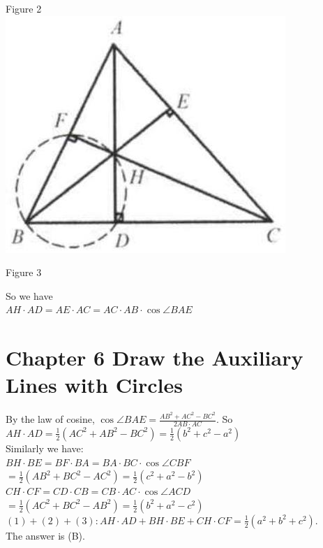 \documentclass[10pt]{article}
\begin{document}
Figure 2\\
\includegraphics[max width=\textwidth, center]{2025_04_17_97bc1f7e44d93c271a88g-210(1)}

Figure 3

So we have\\
\(A H \cdot A D=A E \cdot A C=A C \cdot A B \cdot \cos \angle B A E\)

\section*{Chapter 6 Draw the Auxiliary Lines with Circles}
By the law of cosine, \(\cos \angle B A E=\frac{A B^{2}+A C^{2}-B C^{2}}{2 A B \cdot A C}\). So\\
\(A H \cdot A D=\frac{1}{2}\left(A C^{2}+A B^{2}-B C^{2}\right)=\frac{1}{2}\left(b^{2}+c^{2}-a^{2}\right)\)\\
Similarly we have:\\
\(B H \cdot B E=B F \cdot B A=B A \cdot B C \cdot \cos \angle C B F\)\\
\(=\frac{1}{2}\left(A B^{2}+B C^{2}-A C^{2}\right)=\frac{1}{2}\left(c^{2}+a^{2}-b^{2}\right)\)\\
\(C H \cdot C F=C D \cdot C B=C B \cdot A C \cdot \cos \angle A C D\)\\
\(=\frac{1}{2}\left(A C^{2}+B C^{2}-A B^{2}\right)=\frac{1}{2}\left(b^{2}+a^{2}-c^{2}\right)\)\\
\((1)+(2)+(3): A H \cdot A D+B H \cdot B E+C H \cdot C F=\frac{1}{2}\left(a^{2}+b^{2}+c^{2}\right)\).\\
The answer is (B).
\end{document}
